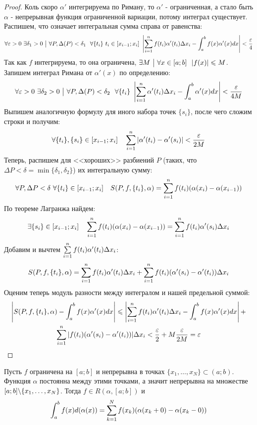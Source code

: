 \begin{proof}
	Коль скоро $\alpha'$ интегрируема по Риману, то $\alpha'$ - ограниченная, а стало быть $\alpha$ - непрерывная функция ограниченной вариации, потому интеграл существует. Распишем, что означает интегральная сумма справа от равенства:
	\[
		\forall \varepsilon > 0\ \exists \delta_1 > 0 \ \big|\  \forall P, \Delta(P) < \delta_1\ \ \forall \{t_i\}\ t_i \in [x_{i - 1};x_i]\  \left|\sum\limits_{i = 1}^n f(t_i) \alpha'(t_i) \Delta x_i - \int_a^b f(x) \alpha'(x) dx\right| < \frac{\varepsilon}{4}
	\]
	Так как $f$ интегрируема, то она ограничена, $\exists M \ \big|\  \forall x \in [a; b]\ \ |f(x)| \leqslant M$. Запишем интеграл Римана от $\alpha'(x)$ по определению:
	\[
		\forall \eps > 0\ \exists \delta_2 > 0 \such \forall P, \Delta(P) < \delta_2\ \ \forall \{t_i\}\ \left|\suml_{i = 1}^n \alpha'(t_i)\Delta x_i - \int_a^b \alpha'(x)dx\right| < \frac{\eps}{4M}
	\]
	Выпишем аналогичную формулу для иного набора точек $\{s_i\}$, после чего сложим строки и получим:
	\[
		\forall \{t_i\}, \{s_i\} \in [x_{i - 1};x_i] \quad \sum\limits_{i = 1}^n|\alpha'(t_i) - \alpha'(s_i)| < \frac{\varepsilon}{2M}
	\]
	Теперь, распишем для <<хороших>> разбиений $P$ (таких, что $\Delta P < \delta = \min \{\delta_1, \delta_2\}$) их интегральную сумму:
	\[
		\forall P, \Delta P < \delta\ \forall \{t_i\} \in [x_{i - 1};x_i] \quad S(P, f, \{t_i\}, \alpha) = \sum\limits_{i = 1}^nf(t_i)(\alpha(x_i) - \alpha(x_{i - 1}))
	\]
	По теореме Лагранжа найдем:
	\[
		\exists \{s_i\} \in [x_{i - 1} ;x_i] \quad \sum\limits_{i = 1}^n f(t_i)(\alpha(x_i) - \alpha(x_{i - 1})) = \sum\limits_{i = 1}^n f(t_i)\alpha'(s_i)\Delta x_i
	\]
	Добавим и вычтем $\sum\limits_{i = 1}^n f(t_i)\alpha'(t_i)\Delta x_i$:
	\[
		S(P, f, \{t_i\}, \alpha) = \sum\limits_{i = 1}^nf(t_i)\alpha'(t_i)\Delta x_i + \sum\limits_{i = 1}^nf(t_i)(\alpha'(s_i) - \alpha'(t_i))\Delta x_i
	\]
	Оценим теперь модуль разности между интегралом и нашей предельной суммой:
	\begin{multline*}
		\left|S(P, f, \{t_i\}, \alpha) - \int_a^b f(x)\alpha'(x)dx \right| \leqslant \left|\sum\limits_{i = 1}^n f(t_i)\alpha'(t_i)\Delta x_i - \int_a^b f(x)\alpha'(x)dx \right| +
		\\
		\sum\limits_{i = 1}^n |f(t_i)(\alpha'(s_i) - \alpha'(t_i))|\Delta x_i < \frac{\varepsilon}{2} + M\frac{\varepsilon}{2M} = \varepsilon
	\end{multline*}
\end{proof}

\begin{theorem}
	Пусть $f$ ограничена на $[a; b]$ и непрерывна в точках $\{x_1, \ldots, x_N\} \subset (a; b)$. Функция $\alpha$ постоянна между этими точками, а значит непрерывна на множестве $[a; b] \backslash \{x_1, \ldots, x_N\}$. Тогда $f \in R(\alpha, [a; b])$ и
	\[
		\int_a^b f(x)d(\alpha(x)) = \sum\limits_{k = 1}^N f(x_k) (\alpha(x_k + 0) - \alpha(x_k - 0))
	\]
\end{theorem}

